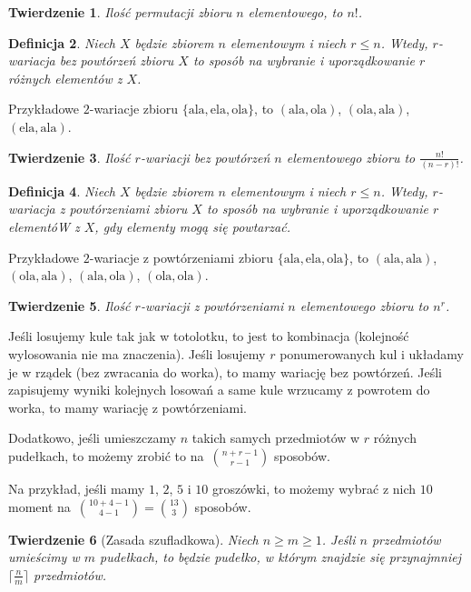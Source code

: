 \documentclass[12pt]{article}
\newtheorem{thm}{Twierdzenie}
\newtheorem{dfn}[thm]{Definicja}
\newcommand{\ala}{\textrm{ala}}
\newcommand{\ela}{\textrm{ela}}
\newcommand{\ola}{\textrm{ola}}
\begin{document}
\begin{thm}
	Ilość permutacji zbioru $n$ elementowego,
	to $n!$.
\end{thm}


\begin{dfn}
	Niech $X$ będzie zbiorem $n$ elementowym i niech $r\leq n$.
	Wtedy, $r$-wariacja bez powtórzeń zbioru $X$ to sposób na wybranie i uporządkowanie $r$ różnych elementów z $X$.
\end{dfn} 

Przykładowe $2$-wariacje zbioru $\{\ala, \ela, \ola\}$,
to $(\ala, \ola)$, $(\ola, \ala)$, $(\ela, \ala)$.

\begin{thm}
	Ilość $r$-wariacji bez powtórzeń $n$ elementowego zbioru 
	to $\frac{n!}{(n-r)!}$.
\end{thm}

\begin{dfn}
	Niech $X$ będzie zbiorem $n$ elementowym i niech $r\leq n$.
	Wtedy, $r$-wariacja z powtórzeniami zbioru $X$ to sposób na wybranie i uporządkowanie $r$ elementóW z $X$, gdy elementy mogą się powtarzać.
\end{dfn} 

Przykładowe $2$-wariacje z powtórzeniami 
zbioru $\{\ala, \ela, \ola\}$,
to $(\ala, \ala)$, $(\ola, \ala)$, 
$(\ala, \ola)$, $(\ola, \ola)$.


\begin{thm}
	Ilość $r$-wariacji z powtórzeniami $n$ elementowego zbioru 
	to $n^r$.
\end{thm}

Jeśli losujemy kule tak jak w totolotku, to jest to kombinacja 
(kolejność wylosowania nie ma znaczenia).
Jeśli losujemy $r$ ponumerowanych kul 
i układamy je w rządek (bez zwracania do worka), to mamy
wariację bez powtórzeń. Jeśli zapisujemy wyniki kolejnych losowań a same kule wrzucamy z powrotem do worka, to mamy
wariację z powtórzeniami.
\bigskip


Dodatkowo, jeśli umieszczamy $n$ takich samych przedmiotów
w $r$ różnych pudełkach, to możemy zrobić to
na~$\binom{n+r-1}{r-1}$ sposobów.

Na przykład, jeśli mamy $1$, $2$, $5$ i $10$ groszówki, 
to możemy wybrać z nich $10$ moment 
na~$\binom{10+4-1}{4-1}=\binom{13}{3}$
sposobów.

\begin{thm}[Zasada szufladkowa]
	Niech $n\geq m\geq 1$. Jeśli $n$ przedmiotów umieścimy w 
	$m$ pudełkach, to będzie pudełko, w którym znajdzie się
	przynajmniej $\lceil \frac{n}{m}\rceil$ przedmiotów.
\end{thm}
\end{document}
